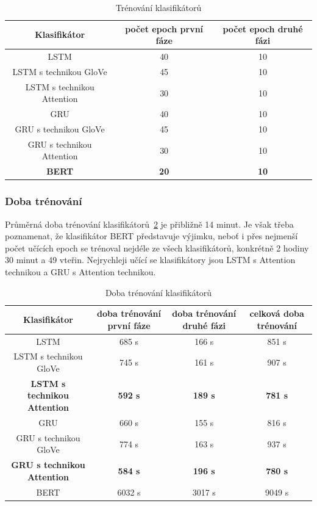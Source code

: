 \begin{table}[H]
	\centering
	\caption{Trénování klasifikátorů}\label{tab:MULTI pocet epoch}
	\begin{tabular}{ c c c }
			\toprule
			Klasifikátor & počet epoch první fáze & počet epoch druhé fázi\\
			\midrule
			LSTM & 40 & 10\\
			LSTM s technikou GloVe & 45 & 10\\
			LSTM s technikou Attention & 30 & 10\\
			GRU & 40 & 10\\
			GRU s technikou GloVe & 45 & 10\\
			GRU s technikou Attention & 30 & 10\\
			\textbf{BERT} & \textbf{20} & \textbf{10}\\
			\midrule
		\end{tabular}
\end{table}

\subsubsection{Doba trénování}
Průměrná doba trénování klasifikátorů~\ref{tab:MULTI doba trenovani} je přibližně 14 minut.
Je však třeba poznamenat, že klasifikátor BERT představuje výjimku, neboť i přes nejmenší počet učících epoch se trénoval nejdéle ze všech klasifikátorů, konkrétně 2 hodiny 30 minut a 49 vteřin.
Nejrychleji učící se klasifikátory jsou LSTM s Attention technikou a GRU s Attention technikou.

\begin{table}[H]
	\centering
	\caption{Doba trénování klasifikátorů}\label{tab:MULTI doba trenovani}
	\begin{tabular}{ c c c c }
			\toprule
			Klasifikátor & doba trénování první fáze & doba trénování druhé fázi & celková doba trénování\\
			\midrule
			LSTM & 685 s & 166 s & 851 s\\
			LSTM s technikou GloVe & 745 s & 161 s & 907 s\\
			\textbf{LSTM s technikou Attention} & \textbf{592 s} & \textbf{189 s} & \textbf{781 s}\\
			GRU & 660 s & 155 s & 816 s\\
			GRU s technikou GloVe & 774 s & 163 s & 937 s\\
			\textbf{GRU s technikou Attention} & \textbf{584 s} & \textbf{196 s} & \textbf{780 s}\\
			BERT & 6032 s & 3017 s & 9049 s\\
			\midrule
		\end{tabular}
\end{table}

